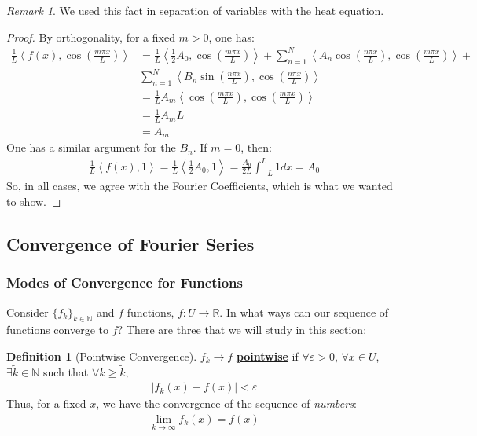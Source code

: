 \documentclass[11pt]{scrartcl}
\theoremstyle{definition}
\newtheorem{definition}{Definition}
\theoremstyle{remark}
\newtheorem{remark}{Remark}
\newcommand{\dfn}[1]{\textbf{\underline{#1}}}
\newcommand{\idx}[2]{\int_{#1}^{#2}}
\newcommand{\R}[0]{\mathbb{R}}
\newcommand{\ip}[2]{\left\langle #1, #2 \right\rangle}
\begin{document}
\begin{remark} 
	We used this fact in separation of variables with the heat equation.
\end{remark}

\begin{proof}
	By orthogonality, for a fixed $m>0$, one has: 
	\begin{align*}
		\frac{1}{L} \ip{f(x)}{\cos \left( \frac{m \pi x}{L} \right)} & = \frac{1}{L} \ip{ \frac{1}{2} A_0}{ \cos \left( \frac{m \pi x}{L} \right)} + \sum_{n=1}^N \ip{A_n \cos \left( \frac{n \pi x}{L} \right)}{ \cos \left( \frac{m \pi x}{L} \right) } +  \\ & \sum_{n=1}^N \ip{B_n \sin \left(  \frac{n \pi x}{L} \right)}{ \cos \left( \frac{n \pi x}{L} \right)}  \\
		& = \frac{1}{L} A_m \ip{ \cos \left( \frac{m \pi x}{L} \right)}{ \cos \left( \frac{m \pi x}{L} \right)}  \\
		& = \frac{1}{L} A_m L \\
		& = A_m
	\end{align*}
	One has a similar argument for the $B_n$. If $m=0$, then: 
	\begin{align*}
		\frac{1}{L} \ip{f(x)}{1} = \frac{1}{L} \ip{\frac{1}{2} A_0}{1} = \frac{A_0}{2L} \idx{-L}{L} 1 dx = A_0
	\end{align*}
	So, in all cases, we agree with the Fourier Coefficients, which is what we wanted to show.
\end{proof}

\subsection{Convergence of Fourier Series}
\subsubsection{Modes of Convergence for Functions}
Consider $\{f_k \}_{k \in \mathbb{N}}$ and $f$ functions, $f: U \rightarrow \R$. In what ways can our sequence of functions converge to $f$? There are three that we will study in this section:

\begin{definition}[Pointwise Convergence]
	$f_k \rightarrow f$ \dfn{pointwise} if $\forall \varepsilon > 0$, $\forall x \in U$, $\exists \widetilde{k} \in \mathbb{N}$ such that $\forall k \geq \widetilde{k}$, 
	\begin{align}
		|f_k(x) - f(x)| < \varepsilon
	\end{align}
	Thus, for a fixed $x$, we have the convergence of the sequence of \emph{numbers}: 
	\begin{align}
		\lim_{k \rightarrow \infty} f_k(x) = f(x) 	
	\end{align}
\end{definition}
\end{document}
